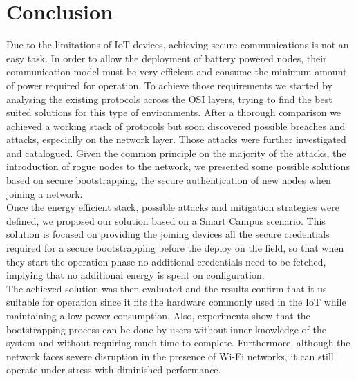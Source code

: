 
\chapter{Conclusion}
\label{chapter:conclusion}
Due to the limitations of \gls{IoT} devices, achieving secure communications is not an easy task. In order to allow the deployment of battery powered nodes, their communication model must be very efficient and consume the minimum amount of power required for operation. To achieve those requirements we started by analysing the existing protocols across the OSI layers, trying to find the best suited solutions for this type of environments. After a thorough comparison we achieved a working stack of protocols but soon discovered possible breaches and attacks, especially on the network layer. Those attacks were further investigated and catalogued. Given the common principle on the majority of the attacks, the introduction of rogue nodes to the network, we presented some possible solutions based on secure bootstrapping, the secure authentication of new nodes when joining a network.\\
Once the energy efficient stack, possible attacks and mitigation strategies were defined, we proposed our solution based on a Smart Campus scenario. This solution is focused on providing the joining devices all the secure credentials required for a secure bootstrapping before the deploy on the field, so that when they start the operation phase no additional credentials need to be fetched, implying that no additional energy is spent on configuration.\\
The achieved solution was then evaluated and the results confirm that it us suitable for operation since it fits the hardware commonly used in the \gls{IoT} while maintaining a low power consumption. Also, experiments show that the bootstrapping process can be done by users without inner knowledge of the system and without requiring much time to complete. Furthermore, although the network faces severe disruption in the presence of Wi-Fi networks, it can still operate under stress with diminished performance.

